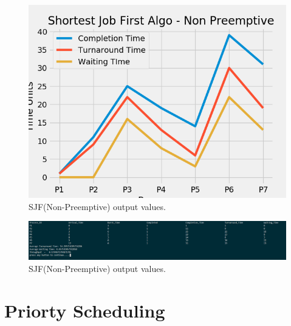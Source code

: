 \documentclass[11pt,a4paper]{report}
\begin{document}
{\begin{figure}[H]
	\centering
	\includegraphics[scale=0.75]{./img/SJF_NP_output.png}
	\caption{SJF(Non-Preemptive) output values.}
\end{figure}}

{\begin{figure}[H]
	\centering
	\includegraphics[scale=0.4]{./img/sjf_np_out.PNG}
	\caption{SJF(Non-Preemptive) output values.}
\end{figure}}


\chapter{Priorty Scheduling}
\end{document}
